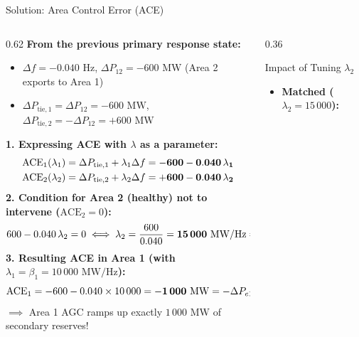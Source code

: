 \begin{frame}{Solution: Area Control Error (ACE)}
\begin{columns}[T]
\begin{column}{0.62\textwidth}
    \scriptsize
    \textbf{From the previous primary response state:}
    \begin{itemize}\setlength{\itemsep}{1pt}
        \item $\Delta f = -0.040\text{ Hz}$, \quad $\Delta P_{12} = -600\text{ MW}$ (Area 2 exports to Area 1)
        \item $\Delta P_{\text{tie},1} = \Delta P_{12} = -600\text{ MW}$, \quad $\Delta P_{\text{tie},2} = -\Delta P_{12} = +600\text{ MW}$
    \end{itemize}
    \vspace{2pt}
    \textbf{1. Expressing ACE with $\lambda$ as a parameter:}
    \begin{align*}
        \setlength{\abovedisplayskip}{2pt}\setlength{\belowdisplayskip}{2pt}
        \text{ACE}_1(\lambda_1) &= \Delta P_{\text{tie},1} + \lambda_1 \Delta f = \mathbf{-600 - 0.040\,\lambda_1} \\
        \text{ACE}_2(\lambda_2) &= \Delta P_{\text{tie},2} + \lambda_2 \Delta f = \mathbf{+600 - 0.040\,\lambda_2}
    \end{align*}
    \textbf{2. Condition for Area 2 (healthy) not to intervene ($\text{ACE}_2 = 0$):}
    \begin{equation*}
        \setlength{\abovedisplayskip}{2pt}\setlength{\belowdisplayskip}{2pt}
        600 - 0.040\,\lambda_2 = 0 \iff \lambda_2 = \frac{600}{0.040} = \mathbf{15\,000\text{ MW/Hz}} = \beta_2!
    \end{equation*}
    \textbf{3. Resulting ACE in Area 1 (with $\lambda_1 = \beta_1 = 10\,000\text{ MW/Hz}$):}
    \begin{equation*}
        \setlength{\abovedisplayskip}{2pt}\setlength{\belowdisplayskip}{2pt}
        \text{ACE}_1 = -600 - 0.040 \times 10\,000 = \mathbf{-1\,000\text{ MW}} = -\Delta P_{e1}
    \end{equation*}
    $\implies$ Area 1 AGC ramps up exactly $1\,000\text{ MW}$ of secondary reserves!
\end{column}
\begin{column}{0.36\textwidth}
    \begin{block}{Impact of Tuning $\lambda_2$}
    \scriptsize
    \begin{itemize}\setlength{\itemsep}{2pt}
        \item \textbf{Matched ($\lambda_2 = 15\,000$):}\\

\end{itemize}
\end{block}
\end{column}
\end{columns}
\end{frame}
